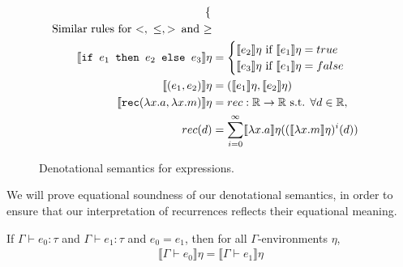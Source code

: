 \begin{figure}
\begin{align*}
\begin{cases}
   \end{cases}
 \\
\text{Similar rules for $<, \ \leq , >$\, and $\geq$} \\
  \llbracket \texttt{if } e_1 \texttt{ then } e_2 \texttt{ else } e_3 \rrbracket \eta &= 
 \begin{cases} 
      \llbracket e_2 \rrbracket\eta \text{ if } \llbracket e_1 \rrbracket\eta = true \\
      \llbracket e_3 \rrbracket\eta \text{ if } \llbracket e_1 \rrbracket\eta = false \\
   \end{cases}
  \\
    \llbracket (e_1,e_2) \rrbracket\eta &= (\llbracket e_1 \rrbracket\eta,\llbracket e_2 \rrbracket\eta) \\
   \llbracket  \texttt{rec} (\lambda x.a, \lambda x.m) \rrbracket\eta &= rec : \mathbb{R} \rightarrow \mathbb{R} \text{ s.t. } \forall d \in \mathbb{R}, \\
   rec(d) &= \sum_{i=0}^{\infty}\llbracket \lambda x.a \rrbracket\eta ((\llbracket \lambda x.m \rrbracket\eta)^i(d))
 \end{align*}
 \caption{Denotational semantics for expressions.}
 \label{fig:densemexps}
 \end{figure}
 
  We will prove equational soundness of our denotational semantics, in order to ensure that
 our interpretation of recurrences reflects their equational meaning.
 \begin{thm}
  If $\Gamma \vdash e_0 : \tau$ and $\Gamma \vdash e_1 : \tau$ and $e_0 = e_1$, then for all $\Gamma$-environments
  $\eta$,   
 \begin{align*}
 \llbracket \Gamma \vdash e_0 \rrbracket \eta 
 = \llbracket \Gamma \vdash e_1 \rrbracket \eta 
 \end{align*} 
 \end{thm}
 
